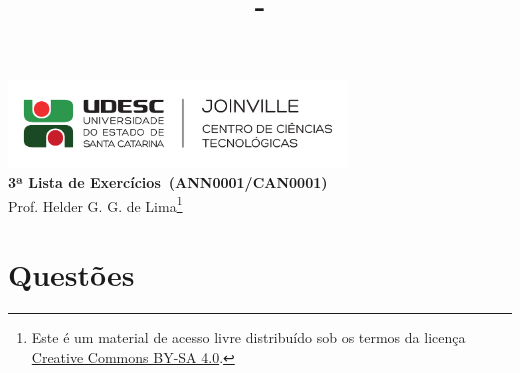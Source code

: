 \documentclass[12pt,a4paper]{article}
\author{\eu}
\title{\tipo - \disciplina}
\date{\data}
\newcommand{\IconPc}{\texttt{[image: computer.png]}}
\newcommand{\IconCalc}{\texttt{[image: calculator.png]}}
\newcommand{\IconThink}{\texttt{[image: pencil.png]}}
\newcommand{\IconCheck}{\texttt{[image: checkmark.png]}}
\newlength{\SmileysLength}
\newcommand{\calc}{\hspace*{-\SmileysLength}\makebox[0pt][r]{\IconCalc}%
   \hspace*{\SmileysLength}}
\newcommand{\software}{\hspace*{-\SmileysLength}\makebox[0pt][r]{\IconPc}%
   \hspace*{\SmileysLength}}
\newcommand{\teoria}{\hspace*{-\SmileysLength}\makebox[0pt][r]{\IconThink}%
   \hspace*{\SmileysLength}}
\newcommand{\conceito}{\hspace*{-\SmileysLength}\makebox[0pt][r]{\IconCheck}%
   \hspace*{\SmileysLength}}
\newcommand*\tipo{3ª Lista de Exercícios}
\newcommand*\disciplina{ANN0001/CAN0001}
\newcommand*\eu{Helder G. G. de Lima}
\begin{document}
\begin{center}
\includegraphics[width=9.0cm]{marca} \\
\textbf{\tipo\ (\disciplina)} \\
Prof. \eu\footnote{
Este é um material de acesso livre distribuído sob os termos da licença \href{https://creativecommons.org/licenses/by-sa/4.0/deed.pt_BR}{Creative Commons BY-SA 4.0}.}
\end{center}


\section*{Questões}
\end{document}
